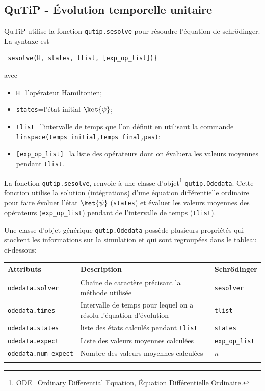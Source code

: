 \subsection{QuTiP - Évolution temporelle unitaire}

QuTiP utilise la fonction \texttt{qutip.sesolve} pour résoudre l'équation de 
schr\"odinger. La syntaxe est\\
\begin{lstlisting}
 sesolve(H, states, tlist, [exp_op_list])}
\end{lstlisting}
avec
\begin{itemize}
\item \texttt{H}=l'opérateur Hamiltonien;
\item \texttt{states}=l'état initial $\ket{\psi}$;
\item \texttt{tlist}=l'intervalle de temps que l'on définit en utilisant la
commande \texttt{linspace(temps\_initial,temps\_final,pas)};
\item \texttt{[exp\_op\_list]}=la liste des opérateurs dont on évaluera les 
valeurs moyennes pendant \texttt{tlist}.
\end{itemize}

La fonction \texttt{qutip.sesolve}, renvoie à une classe 
d'objet\footnote{ODE=Ordinary Differential Equation, Équation Différentielle 
Ordinaire.} \texttt{qutip.Odedata}. Cette fonction utilise la solution 
(intégrations) d'une équation différentielle ordinaire pour faire évoluer 
l'état $\ket{\psi}$ (\texttt{states}) et évaluer les valeurs moyennes 
des opérateurs (\texttt{exp\_op\_list}) pendant de l'intervalle de temps 
(\texttt{tlist}).

Une classe d'objet générique \texttt{qutip.Odedata} possède plusieurs 
propriétés 
qui stockent les informations sur la simulation et qui sont regroupées dans le 
tableau ci-dessous:
\centering
\begin{tabular}{|l|l|l} \hline \hline
\textbf{Attributs} & \textbf{Description} & \textbf{Schrödinger}\\ \hline \hline
\texttt{odedata.solver} & Chaîne de caractère précisant la méthode utilisée & 
\texttt{sesolver}\\ \hline
\texttt{odedata.times} & Intervalle de temps pour lequel on a résolu 
l'équation d'évolution & \texttt{tlist}\\ \hline
\texttt{odedata.states} & liste des états calculés pendant \texttt{tlist} & 
\texttt{states} \\ \hline
\texttt{odedata.expect} & Liste des valeurs moyennes calculées & 
\texttt{exp\_op\_list} \\ \hline
\texttt{odedata.num\_expect} & Nombre des valeurs moyennes calculées & $n$ \\ 
\hline
\\\hline
\end{tabular}

